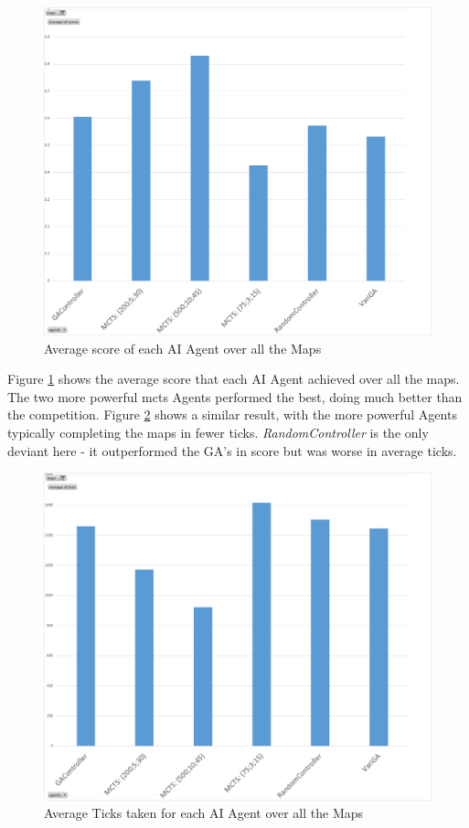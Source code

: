 \documentclass{IEEEtran}
\begin{document}
\begin{figure}[ht]
\centering
\includegraphics[width=\linewidth]{avgScoreOverAllMaps}
\caption{Average score of each AI Agent over all the Maps}
\label{avgScoreAllMaps}
\end{figure}

Figure \ref{avgScoreAllMaps} shows the average score that each AI Agent achieved over all the maps. The two more powerful \gls{mcts} Agents performed the best, doing much better than the competition. Figure \ref{avgTicksAllMaps} shows a similar result, with the more powerful Agents typically completing the maps in fewer ticks. \emph{RandomController} is the only deviant here - it outperformed the GA's in score but was worse in average ticks.

\begin{figure}[ht]
\centering
\includegraphics[width=\linewidth]{avgTicksOverAllMaps}
\caption{Average Ticks taken for each AI Agent over all the Maps}
\label{avgTicksAllMaps}
\end{figure}
\end{document}
